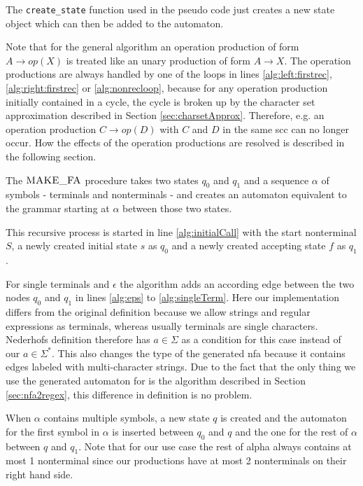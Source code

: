 The \texttt{create\_state} function used in the pseudo code just creates a new state object which can then be added to the automaton.

Note that for the general algorithm an operation production of form $A \rightarrow op(X)$ is treated like an unary production of form $A \rightarrow X$. The operation productions are always handled by one of the loops in lines \ref{alg:left:firstrec}, \ref{alg:right:firstrec} or \ref{alg:nonrecloop}, because for any operation production initially contained in a cycle, the cycle is broken up by the character set approximation described in Section \ref{sec:charsetApprox}.
Therefore, e.g. an operation production $C \rightarrow op(D)$ with $C$ and $D$ in the same \ac{scc} can no longer occur.
How the effects of the operation productions are resolved is described in the following section. 

The $\textproc{MAKE\_FA}$ procedure takes two states $q_0$ and $q_1$ and a sequence $\alpha$ of symbols - terminals and nonterminals - and creates an automaton equivalent to the grammar starting at $\alpha$ between those two states.

This recursive process is started in line \ref{alg:initialCall} with the start nonterminal $S$, a newly created initial state $s$ as $q_0$ and a newly created accepting state $f$ as $q_1$.

For single terminals and $\epsilon$ the algorithm adds an according edge between the two nodes $q_0$ and $q_1$ in lines \ref{alg:eps} to \ref{alg:singleTerm}.
Here our implementation differs from the original definition because we allow strings and regular expressions as terminals, whereas usually terminals are single characters. Nederhofs definition therefore has $a \in \Sigma$ as a condition for this case instead of our $a \in \Sigma^*$.
This also changes the type of the generated \ac{nfa} because it contains edges labeled with multi-character strings. Due to the fact that the only thing we use the generated automaton for is the algorithm described in Section \ref{sec:nfa2regex}, this difference in definition is no problem.

When $\alpha$ contains multiple symbols, a new state $q$ is created and the automaton for the first symbol in $\alpha$ is inserted between $q_0$ and $q$ and the one for the rest of $\alpha$ between $q$ and $q_1$. Note that for our use case the rest of alpha always contains at most 1 nonterminal since our productions have at most 2 nonterminals on their right hand side.

